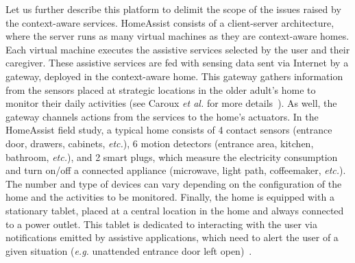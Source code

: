 Let us further describe this platform to delimit the scope of the issues raised by the context-aware services. HomeAssist consists of a client-server architecture, where the server runs as many virtual machines as they are context-aware homes. Each virtual machine executes the assistive services selected by the user and their caregiver. These assistive services are fed with sensing data sent via Internet by a gateway, deployed in the context-aware home. This gateway gathers information from the sensors placed at strategic locations in the older adult's home to monitor their daily activities (see Caroux {\em et al.} for more details~\cite{caroux2014verification}). As well, the gateway channels actions from the services to the home's actuators. In the HomeAssist field study, a typical home consists of 4 contact sensors (entrance door, drawers, cabinets, {\em etc.}), 6 motion detectors (entrance area, kitchen, bathroom, {\em etc.}), and 2 smart plugs, which measure the electricity consumption and turn on/off a connected appliance (microwave, light path, coffeemaker, {\em etc.}). The number and type of devices can vary depending on the configuration of the home and the activities to be monitored. Finally, the home is equipped with a stationary tablet, placed at a central location in the home and always connected to a power outlet. This tablet is dedicated to interacting with the user via notifications emitted by assistive applications, which need to alert the user of a given situation ({\em e.g.} unattended entrance door left open)~\cite{consel2015unifying}.


